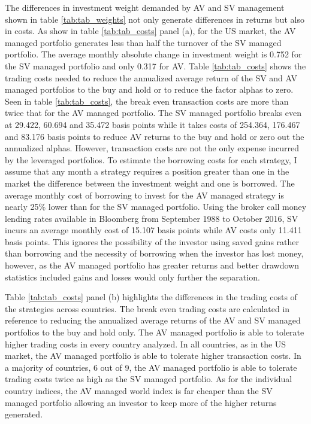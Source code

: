 The differences in investment weight demanded by AV and SV management shown in table \ref{tab:tab_weights} not only generate differences in returns but also in costs. As show in table \ref{tab:tab_costs} panel (a), for the US market, the AV managed portfolio generates less than half the turnover of the SV managed portfolio. The average monthly absolute change in investment weight is 0.752 for the SV managed portfolio and only 0.317 for AV. Table \ref{tab:tab_costs} shows the trading costs needed to reduce the annualized average return of the SV and AV managed portfolios to the buy and hold or to reduce the factor alphas to zero. \citep{frazzini_trading_2015,moreira_volatility-managed_2017} Seen in table \ref{tab:tab_costs}, the break even transaction costs are more than twice that for the AV managed portfolio. The SV managed portfolio breaks even at 29.422, 60.694 and 35.472 basis points while it takes costs of 254.364, 176.467 and 83.176 basis points to reduce AV returns to the buy and hold or zero out the annualized alphas. However, transaction costs are not the only expense incurred by the leveraged portfolios. To estimate the borrowing costs for each strategy, I assume that any month a strategy requires a position greater than one in the market the difference between the investment weight and one is borrowed. The average monthly cost of borrowing to invest for the AV managed strategy is nearly 25\% lower than for the SV managed portfolio. Using the broker call money lending rates available in Bloomberg from September 1988 to October 2016, SV incurs an average monthly cost of 15.107 basis points while AV costs only 11.411 basis points. This ignores the possibility of the investor using saved gains rather than borrowing and the necessity of borrowing when the investor has lost money, however, as the AV managed portfolio has greater returns and better drawdown statistics included gains and losses would only further the separation.

Table \ref{tab:tab_costs} panel (b) highlights the differences in the trading costs of the strategies across countries. The break even trading costs are calculated in reference to reducing the annualized average returns of the AV and SV managed portfolios to the buy and hold only. The AV managed portfolio is able to tolerate higher trading costs in every country analyzed. In all countries, as in the US market, the AV managed portfolio is able to tolerate higher transaction costs. In a majority of countries, 6 out of 9, the AV managed portfolio is able to tolerate trading costs twice as high as the SV managed portfolio. As for the individual country indices, the AV managed world index is far cheaper than the SV managed portfolio allowing an investor to keep more of the higher returns generated.